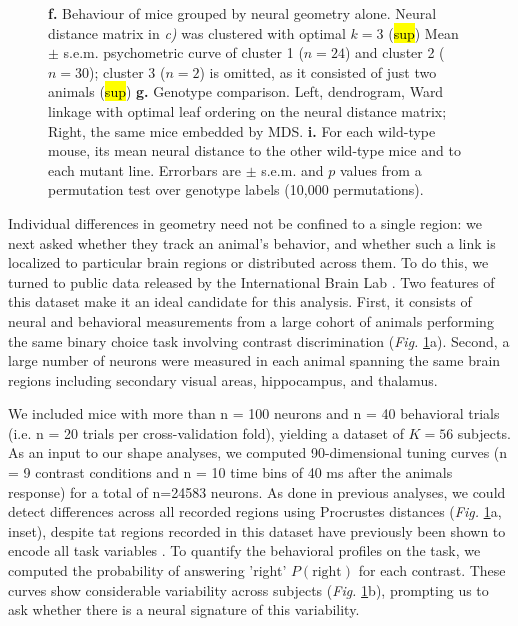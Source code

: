 \begin{figure}
{      \textbf{f.} Behaviour of mice grouped by neural geometry alone. Neural distance matrix in \textit{c)} was clustered with optimal $k = 3$ (\hl{sup}) Mean $\pm$ s.e.m.
  psychometric curve of cluster 1 ($n = 24$) and cluster 2 ($n = 30$); cluster 3 ($n = 2$) is omitted, as it consisted of just two animals (\hl{sup})
      \textbf{g.} Genotype comparison. Left, dendrogram, Ward linkage with optimal leaf ordering on the
  neural distance matrix; Right, the same mice embedded by MDS.
      \textbf{i.} For each wild-type mouse, its mean neural distance to the other wild-type mice and to each mutant line. Errorbars are $\pm$ s.e.m. and $p$ values from a permutation test
  over genotype labels (10{,}000 permutations).}

    \label{fig:ibl}
\end{figure}

Individual differences in geometry need not be confined to a single region: we next asked whether they track an animal's behavior, and whether such a link is localized to particular brain regions or distributed across them.
To do this, we turned to public data released by the International Brain Lab \parencite{iblreproducibility}.
Two features of this dataset make it an ideal candidate for this analysis.
First, it consists of neural and behavioral measurements from a large cohort of animals performing the same binary choice task involving contrast discrimination (\textit{Fig.} \ref{fig:ibl}a).
Second, a large number of neurons were measured in each animal spanning the same brain regions including secondary visual areas, hippocampus, and thalamus.

We included mice with more than n = 100 neurons and n = 40 behavioral trials (i.e. n = 20 trials per cross-validation fold), yielding a dataset of $K= 56$ subjects. As an input to our shape analyses, we computed 90-dimensional tuning curves (n = 9 contrast conditions and n = 10 time bins of 40 ms after the animals response) for a total of n=24583 neurons. As done in previous analyses, we could detect differences across all recorded regions using Procrustes distances (\textit{Fig.} \ref{fig:ibl}a, inset), despite tat regions recorded in this dataset have previously been shown to encode all task variables \parencite{iblreproducibility}.
To quantify the behavioral profiles on the task, we computed the probability of answering 'right' $P(\text{right})$ for each contrast.
These curves show considerable variability across subjects (\textit{Fig.} \ref{fig:ibl}b), prompting us to ask whether there is a neural signature of this variability.

